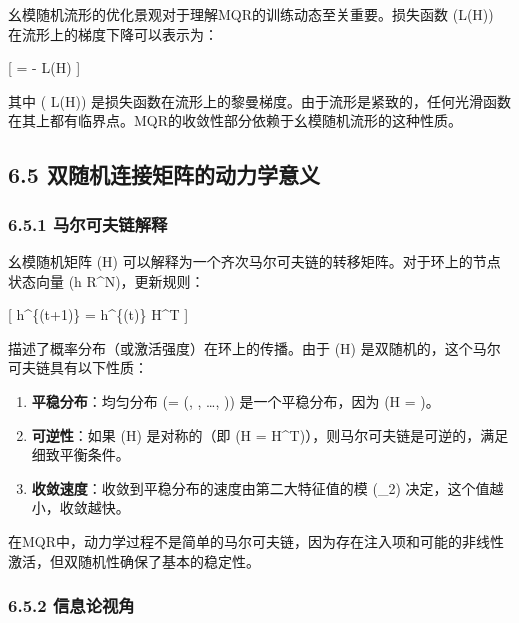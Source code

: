 \documentclass[
  12pt,
]{article}
\begin{document}
幺模随机流形的优化景观对于理解MQR的训练动态至关重要。损失函数 (L(H))
在流形上的梯度下降可以表示为：

{[}  = - L(H) {]}

其中 ( L(H))
是损失函数在流形上的黎曼梯度。由于流形是紧致的，任何光滑函数在其上都有临界点。MQR的收敛性部分依赖于幺模随机流形的这种性质。

\hypertarget{ux53ccux968fux673aux8fdeux63a5ux77e9ux9635ux7684ux52a8ux529bux5b66ux610fux4e49}{%
\subsection{6.5
双随机连接矩阵的动力学意义}\label{ux53ccux968fux673aux8fdeux63a5ux77e9ux9635ux7684ux52a8ux529bux5b66ux610fux4e49}}

\hypertarget{ux9a6cux5c14ux53efux592bux94feux89e3ux91ca}{%
\subsubsection{6.5.1
马尔可夫链解释}\label{ux9a6cux5c14ux53efux592bux94feux89e3ux91ca}}

幺模随机矩阵 (H)
可以解释为一个齐次马尔可夫链的转移矩阵。对于环上的节点状态向量 (h
\in R\^{}N)，更新规则：

{[} h\^{}\{(t+1)\} = h\^{}\{(t)\} H\^{}T {]}

描述了概率分布（或激活强度）在环上的传播。由于 (H)
是双随机的，这个马尔可夫链具有以下性质：

\begin{enumerate}
\def\labelenumi{\arabic{enumi}.}
\item
  \textbf{平稳分布}：均匀分布 (\pi = (, , \ldots,
  )) 是一个平稳分布，因为 (\pi H = \pi)。
\item
  \textbf{可逆性}：如果 (H) 是对称的（即 (H =
  H\^{}T)），则马尔可夫链是可逆的，满足细致平衡条件。
\item
  \textbf{收敛速度}：收敛到平稳分布的速度由第二大特征值的模
  (\textbar{}\lambda\_2\textbar) 决定，这个值越小，收敛越快。
\end{enumerate}

在MQR中，动力学过程不是简单的马尔可夫链，因为存在注入项和可能的非线性激活，但双随机性确保了基本的稳定性。

\hypertarget{ux4fe1ux606fux8bbaux89c6ux89d2}{%
\subsubsection{6.5.2 信息论视角}\label{ux4fe1ux606fux8bbaux89c6ux89d2}}
\end{document}
